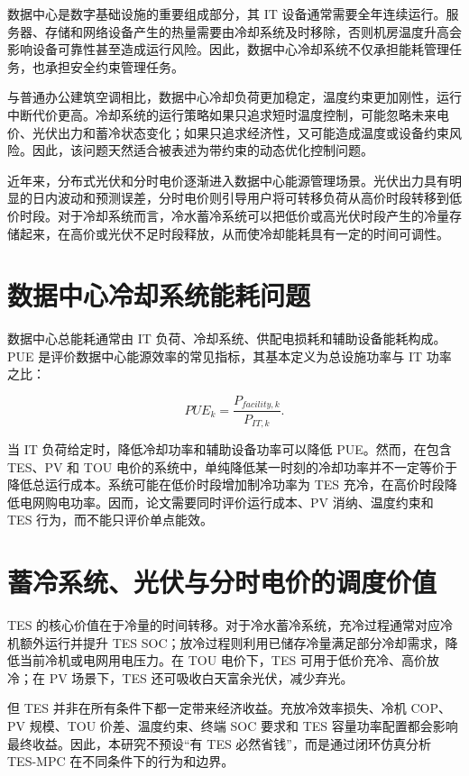 \documentclass[UTF8,a4paper,12pt]{ctexrep}
\begin{document}
数据中心是数字基础设施的重要组成部分，其 IT 设备通常需要全年连续运行。服务器、存储和网络设备产生的热量需要由冷却系统及时移除，否则机房温度升高会影响设备可靠性甚至造成运行风险。因此，数据中心冷却系统不仅承担能耗管理任务，也承担安全约束管理任务。

与普通办公建筑空调相比，数据中心冷却负荷更加稳定，温度约束更加刚性，运行中断代价更高。冷却系统的运行策略如果只追求短时温度控制，可能忽略未来电价、光伏出力和蓄冷状态变化；如果只追求经济性，又可能造成温度或设备约束风险。因此，该问题天然适合被表述为带约束的动态优化控制问题。

近年来，分布式光伏和分时电价逐渐进入数据中心能源管理场景。光伏出力具有明显的日内波动和预测误差，分时电价则引导用户将可转移负荷从高价时段转移到低价时段。对于冷却系统而言，冷水蓄冷系统可以把低价或高光伏时段产生的冷量存储起来，在高价或光伏不足时段释放，从而使冷却能耗具有一定的时间可调性。

\section{数据中心冷却系统能耗问题}

数据中心总能耗通常由 IT 负荷、冷却系统、供配电损耗和辅助设备能耗构成。PUE 是评价数据中心能源效率的常见指标，其基本定义为总设施功率与 IT 功率之比：

\begin{equation}
  PUE_k = \frac{P_{facility,k}}{P_{IT,k}}.
\end{equation}

当 IT 负荷给定时，降低冷却功率和辅助设备功率可以降低 PUE。然而，在包含 TES、PV 和 TOU 电价的系统中，单纯降低某一时刻的冷却功率并不一定等价于降低总运行成本。系统可能在低价时段增加制冷功率为 TES 充冷，在高价时段降低电网购电功率。因而，论文需要同时评价运行成本、PV 消纳、温度约束和 TES 行为，而不能只评价单点能效。

\section{蓄冷系统、光伏与分时电价的调度价值}

TES 的核心价值在于冷量的时间转移。对于冷水蓄冷系统，充冷过程通常对应冷机额外运行并提升 TES SOC；放冷过程则利用已储存冷量满足部分冷却需求，降低当前冷机或电网用电压力。在 TOU 电价下，TES 可用于低价充冷、高价放冷；在 PV 场景下，TES 还可吸收白天富余光伏，减少弃光。

但 TES 并非在所有条件下都一定带来经济收益。充放冷效率损失、冷机 COP、PV 规模、TOU 价差、温度约束、终端 SOC 要求和 TES 容量功率配置都会影响最终收益。因此，本研究不预设“有 TES 必然省钱”，而是通过闭环仿真分析 TES-MPC 在不同条件下的行为和边界。
\end{document}
